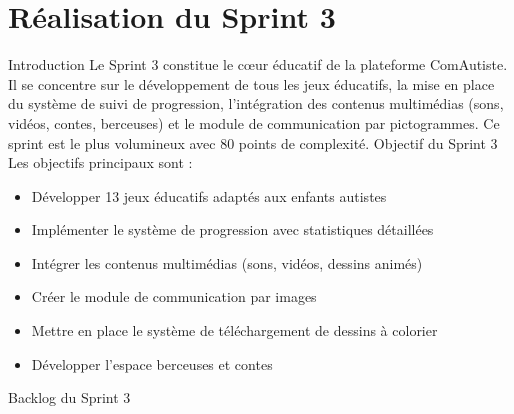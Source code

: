 \documentclass[12pt,a4paper]{report}
\begin{document}
\chapter{Réalisation du Sprint 3}
Introduction
Le Sprint 3 constitue le cœur éducatif de la plateforme ComAutiste. Il se concentre sur le développement de tous les jeux éducatifs, la mise en place du système de suivi de progression, l'intégration des contenus multimédias (sons, vidéos, contes, berceuses) et le module de communication par pictogrammes. Ce sprint est le plus volumineux avec 80 points de complexité.
Objectif du Sprint 3
Les objectifs principaux sont :
\begin{itemize}
\item Développer 13 jeux éducatifs adaptés aux enfants autistes
\item Implémenter le système de progression avec statistiques détaillées
\item Intégrer les contenus multimédias (sons, vidéos, dessins animés)
\item Créer le module de communication par images
\item Mettre en place le système de téléchargement de dessins à colorier
\item Développer l'espace berceuses et contes
\end{itemize}
Backlog du Sprint 3
\end{document}
